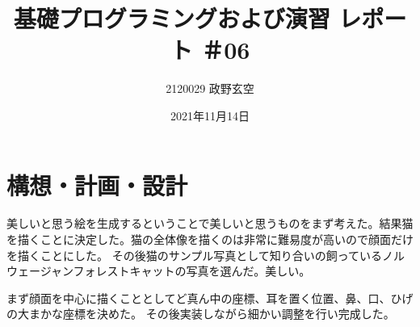 \documentclass[12pt,a4j]{jarticle}
\begin{document}
\title{基礎プログラミングおよび演習 レポート ＃06}
\author{2120029 政野玄空}
\date{2021年11月14日}
\maketitle

\section{構想・計画・設計}

美しいと思う絵を生成するということで美しいと思うものをまず考えた。結果猫を描くことに決定した。猫の全体像を描くのは非常に難易度が高いので顔面だけを描くことにした。
その後猫のサンプル写真として知り合いの飼っているノルウェージャンフォレストキャットの写真を選んだ。美しい。

まず顔面を中心に描くこととしてど真ん中の座標、耳を置く位置、鼻、口、ひげの大まかな座標を決めた。
その後実装しながら細かい調整を行い完成した。
\end{document}
